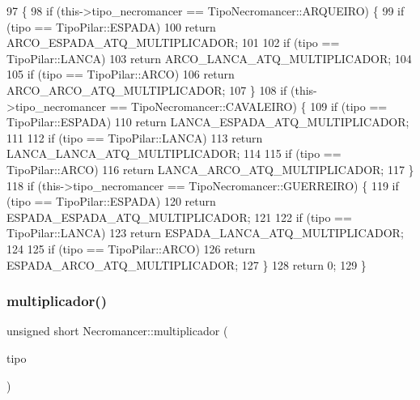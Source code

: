 \begin{DoxyCode}
97                                                         \{
98     \textcolor{keywordflow}{if} (this->tipo\_necromancer == TipoNecromancer::ARQUEIRO) \{
99         \textcolor{keywordflow}{if} (tipo == TipoPilar::ESPADA)
100             \textcolor{keywordflow}{return} ARCO\_ESPADA\_ATQ\_MULTIPLICADOR;
101 
102         \textcolor{keywordflow}{if} (tipo == TipoPilar::LANCA)
103             \textcolor{keywordflow}{return} ARCO\_LANCA\_ATQ\_MULTIPLICADOR;
104 
105         \textcolor{keywordflow}{if} (tipo == TipoPilar::ARCO)
106             \textcolor{keywordflow}{return} ARCO\_ARCO\_ATQ\_MULTIPLICADOR;
107     \}
108     \textcolor{keywordflow}{if} (this->tipo\_necromancer == TipoNecromancer::CAVALEIRO) \{
109         \textcolor{keywordflow}{if} (tipo == TipoPilar::ESPADA)
110             \textcolor{keywordflow}{return} LANCA\_ESPADA\_ATQ\_MULTIPLICADOR;
111 
112         \textcolor{keywordflow}{if} (tipo == TipoPilar::LANCA)
113             \textcolor{keywordflow}{return} LANCA\_LANCA\_ATQ\_MULTIPLICADOR;
114 
115         \textcolor{keywordflow}{if} (tipo == TipoPilar::ARCO)
116             \textcolor{keywordflow}{return} LANCA\_ARCO\_ATQ\_MULTIPLICADOR;
117     \}
118     \textcolor{keywordflow}{if} (this->tipo\_necromancer == TipoNecromancer::GUERREIRO) \{
119         \textcolor{keywordflow}{if} (tipo == TipoPilar::ESPADA)
120             \textcolor{keywordflow}{return} ESPADA\_ESPADA\_ATQ\_MULTIPLICADOR;
121 
122         \textcolor{keywordflow}{if} (tipo == TipoPilar::LANCA)
123             \textcolor{keywordflow}{return} ESPADA\_LANCA\_ATQ\_MULTIPLICADOR;
124 
125         \textcolor{keywordflow}{if} (tipo == TipoPilar::ARCO)
126             \textcolor{keywordflow}{return} ESPADA\_ARCO\_ATQ\_MULTIPLICADOR;
127     \}
128     \textcolor{keywordflow}{return} 0;
129 \}
\end{DoxyCode}
\mbox{\label{class_necromancer_ad8a25efaa26240e028c893d1df80b067}} 
\subsubsection{\texorpdfstring{multiplicador()}{multiplicador()}\hspace{0.1cm}{\footnotesize\ttfamily [2/2]}}
{\footnotesize\ttfamily unsigned short Necromancer\+::multiplicador (\begin{DoxyParamCaption}\item[{Tipo\+Necromancer}]{tipo }\end{DoxyParamCaption})}


